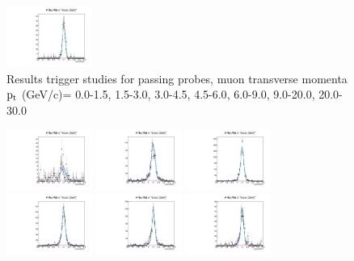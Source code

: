 \documentclass{article}
\begin{document}
\begin{figure}
    \includegraphics[width=0.25\textwidth]{../PlotsRooFitMC/croofit_trk_pass_6.pdf}
    \caption{Results trigger studies for passing probes, muon transverse momenta
    $\rm p_{t}$ (GeV/c)= {0.0-1.5}, {1.5-3.0}, {3.0-4.5}, {4.5-6.0}, 
    {6.0-9.0}, {9.0-20.0}, {20.0-30.0}}
\end{figure}

\begin{figure}
    \includegraphics[width=0.25\textwidth]{../PlotsRooFitMC/croofit_trk_fail_0.pdf}
    \includegraphics[width=0.25\textwidth]{../PlotsRooFitMC/croofit_trk_fail_1.pdf}
    \includegraphics[width=0.25\textwidth]{../PlotsRooFitMC/croofit_trk_fail_2.pdf}
    \includegraphics[width=0.25\textwidth]{../PlotsRooFitMC/croofit_trk_fail_3.pdf}
    \includegraphics[width=0.25\textwidth]{../PlotsRooFitMC/croofit_trk_fail_4.pdf}
    \includegraphics[width=0.25\textwidth]{../PlotsRooFitMC/croofit_trk_fail_5.pdf}

\end{figure}
\end{document}
